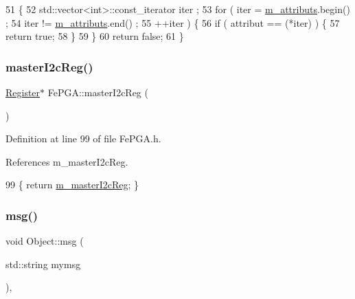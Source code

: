 \begin{DoxyCode}
51   \{
52     std::vector<int>::const\_iterator iter ;
53     \textcolor{keywordflow}{for} ( iter  = \hyperlink{classAttrib_ac4bd58a0cc6b38a3b711d609a3d3aacc}{m\_attributs}.begin() ;
54           iter != \hyperlink{classAttrib_ac4bd58a0cc6b38a3b711d609a3d3aacc}{m\_attributs}.end()   ;
55           ++iter ) \{
56       \textcolor{keywordflow}{if} ( attribut == (*iter) ) \{
57         \textcolor{keywordflow}{return} \textcolor{keyword}{true};
58       \}
59     \}
60     \textcolor{keywordflow}{return} \textcolor{keyword}{false};
61   \}
\end{DoxyCode}
\mbox{\label{classFePGA_a2bcd2c468fc3e1bcadc9bd8800b325a0}} 
\subsubsection{\texorpdfstring{master\+I2c\+Reg()}{masterI2cReg()}}
{\footnotesize\ttfamily \hyperlink{classRegister}{Register}$\ast$ Fe\+P\+G\+A\+::master\+I2c\+Reg (\begin{DoxyParamCaption}{ }\end{DoxyParamCaption})\hspace{0.3cm}{\ttfamily [inline]}}



Definition at line 99 of file Fe\+P\+G\+A.\+h.



References m\+\_\+master\+I2c\+Reg.


\begin{DoxyCode}
99 \{ \textcolor{keywordflow}{return} \hyperlink{classFePGA_adb390ea8de4a6cbce648dc62e4405f32}{m\_masterI2cReg}; \}
\end{DoxyCode}
\mbox{\label{classObject_a58b2d0618c2d08cf2383012611528d97}} 
\subsubsection{\texorpdfstring{msg()}{msg()}\hspace{0.1cm}{\footnotesize\ttfamily [1/2]}}
{\footnotesize\ttfamily void Object\+::msg (\begin{DoxyParamCaption}\item[{std\+::string}]{mymsg }\end{DoxyParamCaption})\hspace{0.3cm}{\ttfamily [inline]}, {\ttfamily [inherited]}}



